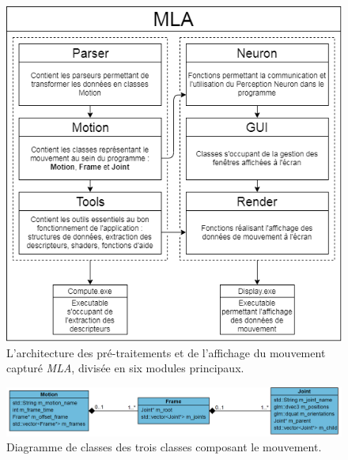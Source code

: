 \begin{figure}[h]
    \centering
    \includegraphics[width=\textwidth]{pictures/MLA_architecture.png}
    \caption[Architecture des pré-traitements et de l'affichage du mouvement capturé de \textit{MLA}]{L'architecture des pré-traitements et de l'affichage du mouvement capturé \textit{MLA}, divisée en six modules principaux.}
    \label{fig:MLA_architecture}
\end{figure}

\begin{figure}[h]
    \centering
    \includegraphics[width=\textwidth]{pictures/class_diagram_motion_MLA.png}
    \caption[Diagramme de classes du mouvement]{Diagramme de classes des trois classes composant le mouvement.}
    \label{fig:class_diagram_motion_MLA}
\end{figure}

